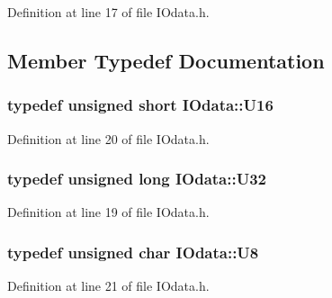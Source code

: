 Definition at line 17 of file IOdata.h.

\subsection{Member Typedef Documentation}
\hypertarget{classIOdata_a1eb45b348534a7c19a4a99b746e693ff}{
\subsubsection[{U16}]{\setlength{\rightskip}{0pt plus 5cm}typedef unsigned short {\bf IOdata::U16}}}
\label{classIOdata_a1eb45b348534a7c19a4a99b746e693ff}


Definition at line 20 of file IOdata.h.\hypertarget{classIOdata_a96fb57f5fcd87b708743abd3c86a5198}{
\subsubsection[{U32}]{\setlength{\rightskip}{0pt plus 5cm}typedef unsigned long {\bf IOdata::U32}}}
\label{classIOdata_a96fb57f5fcd87b708743abd3c86a5198}


Definition at line 19 of file IOdata.h.\hypertarget{classIOdata_a18d1354b7cdaf0f8a8001fdbb3ced418}{
\subsubsection[{U8}]{\setlength{\rightskip}{0pt plus 5cm}typedef unsigned char {\bf IOdata::U8}}}
\label{classIOdata_a18d1354b7cdaf0f8a8001fdbb3ced418}


Definition at line 21 of file IOdata.h.

